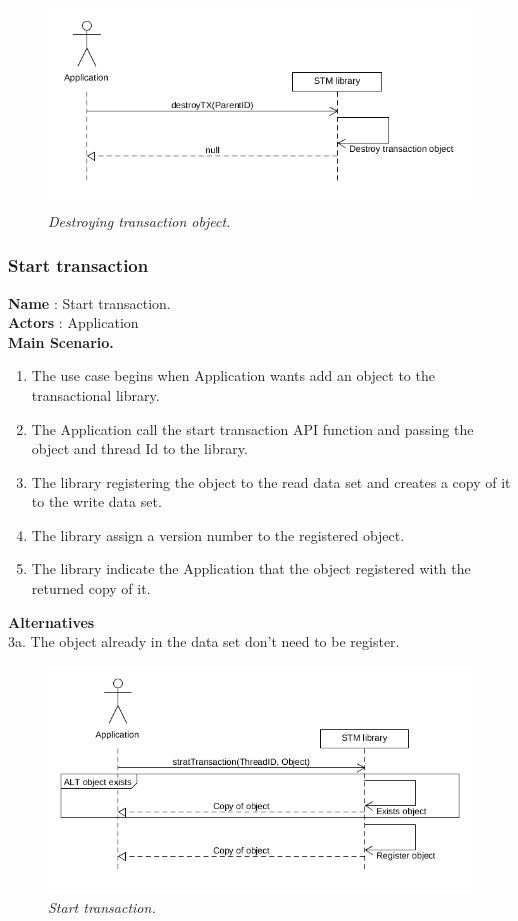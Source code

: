 \documentclass[12pt]{article}
\begin{document}
{\begin{figure}[h!]
\centering
\includegraphics[scale=0.5]{Pictures/destroy.png}
\caption{\textit{\color{gray}Destroying transaction object.}}
\end{figure}

\subsubsection{Start transaction}
\textbf{Name} : Start transaction.\\
\textbf{Actors} : Application\\
\textbf{Main Scenario.}
\begin{enumerate}
  \item The use case begins when Application wants add an object to the transactional library.
  \item The Application call the start transaction API function and passing the object and thread Id to the library.
  \item The library registering the object to the read data set and creates a copy of it to the write data set.
  \item The library assign a version number to the registered object.
  \item The library indicate the Application that the object registered with the returned copy of it.
\end{enumerate}
\textbf{Alternatives}\\
3a. The object already in the data set don't need to be register.\\

\begin{figure}[h!]
\centering
\includegraphics[scale=0.5]{Pictures/start.png}
\caption{\textit{\color{gray}Start transaction.}}
\end{figure}

}
\end{document}
